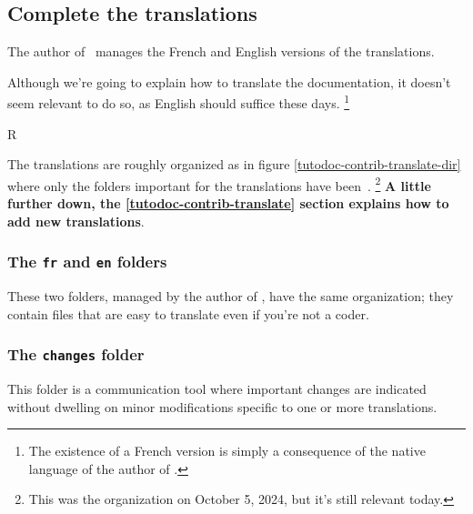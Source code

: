 
\subsection{Complete the translations}

\begin{tdocnote}
    The author of \thisproj\ manages the French and English versions of the translations.
\end{tdocnote}


\begin{tdoccaut}
    Although we're going to explain how to translate the documentation, it doesn't seem relevant to do so, as English should suffice these days.%
    \footnote{
      The existence of a French version is simply a consequence of the native language of the author of \thisproj.
    }
\end{tdoccaut}


\begin{wrapfigure}{R}
    \contribtranslatedirtree\
    \caption{Simplified view of the translation folder}
    \label{tutodoc-contrib-translate-dir}
\end{wrapfigure}{}


The translations are roughly organized as in figure \ref{tutodoc-contrib-translate-dir} where only the folders important for the translations have been \,.%
\footnote{
    This was the organization on October 5, 2024, but it's still relevant today.
}
\textbf{A little further down, the \ref{tutodoc-contrib-translate} section explains how to add new translations}.


\subsubsection{The \texttt{fr} and \texttt{en} folders}

These two folders, managed by the author of \thisproj, have the same organization; they contain files that are easy to translate even if you're not a coder.


\subsubsection{The \texttt{changes} folder}

This folder is a communication tool where important changes are indicated without dwelling on minor modifications specific to one or more translations.


